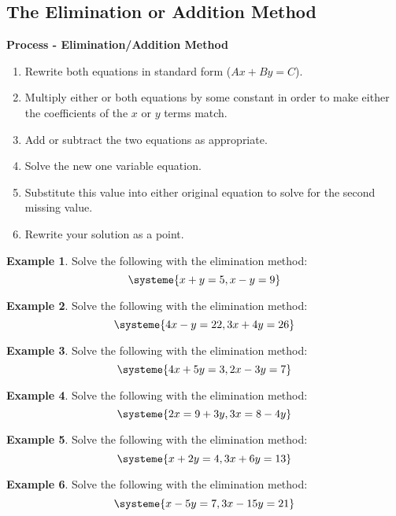 \documentclass[addpoints,12pt]{exam}
\theoremstyle{definition}
\theoremstyle{break}
\theoremstyle{break}
\newtheorem{example}{Example}[subsection]
\begin{document}
\setcounter{section}{4}
\setcounter{subsection}{2}

\subsection{The Elimination or Addition Method}

\vspace{.15in}

\begin{mdframed}
\textbf{Process - Elimination/Addition Method}
\begin{enumerate}
\item Rewrite both equations in standard form ($Ax + By = C$).
\item Multiply either or both equations by some constant in order to make either the coefficients of the $x$ or $y$ terms match.
\item Add or subtract the two equations as appropriate.
\item Solve the new one variable equation.
\item Substitute this value into either original equation to solve for the second missing value.
\item Rewrite your solution as a point.
\end{enumerate}
\end{mdframed}

\vspace{.15in}

\begin{example}
Solve the following with the elimination method:
\[\systeme{x+y=5,x-y=9}\]
\vspace{2in}
\end{example}

\newpage

\begin{example}
Solve the following with the elimination method:
\[\systeme{4x-y=22,3x+4y=26}\]
\vspace{3in}
\end{example}

\begin{example}
Solve the following with the elimination method:
\[\systeme{4x+5y=3,2x-3y=7}\]
\vspace{3in}
\end{example}

\newpage

\begin{example}
Solve the following with the elimination method:
\[\systeme{2x = 9 + 3y,3x = 8-4y}\]
\vspace{4in}
\end{example}

\begin{example}
Solve the following with the elimination method:
\[\systeme{x+2y=4,3x+6y=13}\]
\end{example}

\newpage

\begin{example}
Solve the following with the elimination method:
\[\systeme{x-5y=7,3x-15y=21}\]
\vspace{4in}
\end{example}
\end{document}
